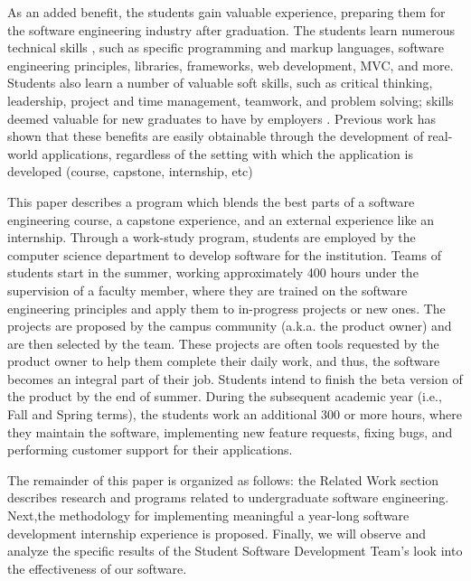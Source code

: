 As an added benefit, the students gain valuable experience, preparing them for the software engineering industry after graduation. The students learn numerous technical skills \cite{hardskills}, such as specific programming and markup languages, software engineering principles, libraries, frameworks, web development, MVC, and more. Students also learn a number of valuable soft skills, such as critical thinking, leadership, project and time management, teamwork, and problem solving; skills deemed valuable for new graduates to have by employers \cite{lavy2013soft}. Previous work has shown that these benefits are easily obtainable through the development of real-world applications, regardless of the setting with which the application is developed (course, capstone, internship, etc) \cite{heggen2018hiring, liu2005enriching, alzamil2005towards}

This paper describes a program which blends the best parts of a software engineering course, a capstone experience, and an external experience like an internship. Through a work-study program, students are employed by the computer science department to develop software for the institution. Teams of students start in the summer, working approximately 400 hours under the supervision of a faculty member, where they are trained on the software engineering principles and apply them to in-progress projects or new ones. The projects are proposed by the campus community (a.k.a. the product owner) and are then selected by the team. These projects are often tools requested by the product owner to help them complete their daily work, and thus, the software becomes an integral part of their job. Students intend to finish the beta version of the product by the end of summer. During the subsequent academic year (i.e., Fall and Spring terms), the students work an additional 300 or more hours, where they maintain the software, implementing new feature requests, fixing bugs, and performing customer support for their applications. 

The remainder of this paper is organized as follows: the Related Work section describes research and programs related to undergraduate software engineering. Next,the methodology for implementing meaningful a year-long software development internship experience is proposed. Finally, we will observe and analyze the specific results of the Student Software Development Team's look into the effectiveness of our software.
